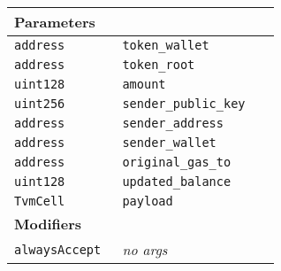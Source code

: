 \ifsoltables
\noindent\begin{tabular}{|l|l|p{5cm}|}\hline
\multicolumn{3}{|l|}{\bf Parameters}\\\hline
\tt address & \tt token\_{}wallet &\\\hline
\tt address & \tt token\_{}root &\\\hline
\tt uint128 & \tt amount &\\\hline
\tt uint256 & \tt sender\_{}public\_{}key &\\\hline
\tt address & \tt sender\_{}address &\\\hline
\tt address & \tt sender\_{}wallet &\\\hline
\tt address & \tt original\_{}gas\_{}to &\\\hline
\tt uint128 & \tt updated\_{}balance &\\\hline
\tt TvmCell & \tt payload &\\\hline
\multicolumn{3}{|l|}{\bf Modifiers}\\\hline
\tt alwaysAccept & {\em no args} &\\\hline
\end{tabular}
\fi

\vspace{2cm}

